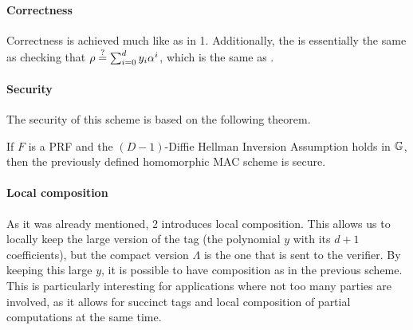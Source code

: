 \paragraph*{Correctness} Correctness is achieved much like as in
1. Additionally, the
 is essentially the same as checking that $\rho
\overset{?}{=} \sum_{i=0}^d y_i \alpha^i$, which is the same as
.

\paragraph*{Security} The security of this scheme is based on the following
theorem.
\begin{theorem}
  If $F$ is a PRF and the $(D-1)$-Diffie Hellman Inversion Assumption holds in
  $\mathbb{G}$, then the previously defined homomorphic MAC scheme is secure.
  \label{theo:cf-2-sec}
\end{theorem}

\paragraph*{Local composition} As it was already mentioned,
2 introduces local composition. This allows us
to locally keep the large version of the tag (the polynomial $y$ with its $d
+ 1$ coefficients), but the compact version $\Lambda$ is the one that is sent
to the verifier. By keeping this large $y$, it is possible to have composition
as in the previous scheme. This is particularly interesting for applications
where not too many parties are involved, as it allows for succinct tags and
local composition of partial computations at the same time.
